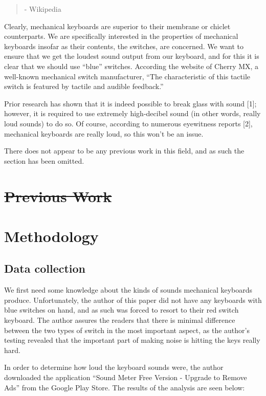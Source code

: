 \documentclass{article}
\begin{document}
\begin{multicols}{2}
\begin{quote}
    \hfill - Wikipedia
\end{quote}


Clearly, mechanical keyboards are superior to their membrane or chiclet counterparts. We are specifically interested in the properties of mechanical keyboards insofar as their contents, the switches, are concerned. We want to ensure that we get the loudest sound output from our keyboard, and for this it is clear that we should use ``blue'' switches. According the website of Cherry MX, a well-known mechanical switch manufacturer, ``The characteristic of this tactile switch is featured by tactile and audible feedback.''

Prior research has shown that it is indeed possible to break glass with sound [1]; however, it is required to use extremely high-decibel sound (in other words, really loud sounds) to do so. Of course, according to numerous eyewitness reports [2], mechanical keyboards are really loud, so this won't be an issue.


There does not appear to be any previous work in this field, and as such the section has been omitted. 

\section{\sout{Previous Work}}


\section{Methodology}

\subsection{Data collection}

We first need some knowledge about the kinds of sounds mechanical keyboards produce. Unfortunately, the author of this paper did not have any keyboards with blue switches on hand, and as such was forced to resort to their red switch keyboard. The author assures the readers that there is minimal difference between the two types of switch in the most important aspect, as the author's testing revealed that the important part of making noise is hitting the keys really hard.

In order to determine how loud the keyboard sounds were, the author downloaded the application ``Sound Meter Free Version - Upgrade to Remove Ads'' from the Google Play Store. The results of the analysis are seen below:


\end{multicols}
\end{document}
